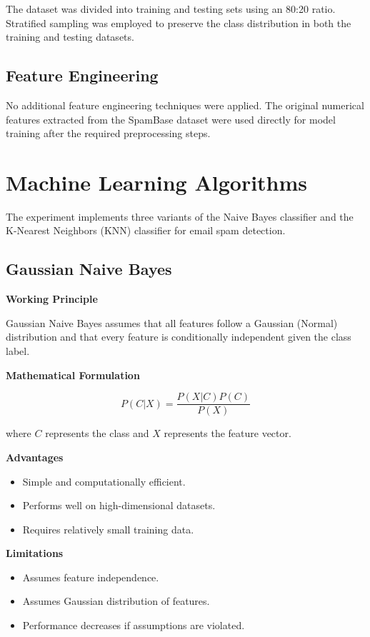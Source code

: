 \documentclass{article}
\begin{document}
The dataset was divided into training and testing sets using an 80:20 ratio. Stratified sampling was employed to preserve the class distribution in both the training and testing datasets.

\subsection*{Feature Engineering}

No additional feature engineering techniques were applied. The original numerical features extracted from the SpamBase dataset were used directly for model training after the required preprocessing steps.

\section{Machine Learning Algorithms}

The experiment implements three variants of the Naive Bayes classifier and the K-Nearest Neighbors (KNN) classifier for email spam detection.

\subsection{Gaussian Naive Bayes}

\textbf{Working Principle}

Gaussian Naive Bayes assumes that all features follow a Gaussian (Normal) distribution and that every feature is conditionally independent given the class label.

\textbf{Mathematical Formulation}

\[
P(C|X)=\frac{P(X|C)P(C)}{P(X)}
\]

where \(C\) represents the class and \(X\) represents the feature vector.

\textbf{Advantages}

\begin{itemize}
\item Simple and computationally efficient.
\item Performs well on high-dimensional datasets.
\item Requires relatively small training data.
\end{itemize}

\textbf{Limitations}

\begin{itemize}
\item Assumes feature independence.
\item Assumes Gaussian distribution of features.
\item Performance decreases if assumptions are violated.
\end{itemize}
\end{document}
